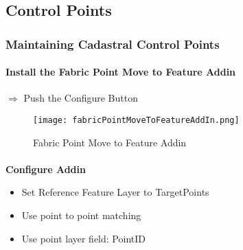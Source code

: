 \documentclass[class=article , crop=false, titlepage, twoside, multi={itemize, figure, verbatim}, float=false]{standalone}
\title{}  %
\begin{document}

\ifstandalone
\maketitle %
\tableofcontents %
\clearpage
\fi

\subsection{Control Points}
\medskip
\subsubsection[Editing Control Points]{Maintaining Cadastral Control Points}
\vspace{.1in}

\paragraph[Fabric Point Move to Feature Addin]{\textbf{ Install the Fabric Point Move to Feature Addin}}
\vspace{.1in}

{\Large $\Rightarrow$ Push the Configure Button}

\begin{figure}[h!]
\centering
    \texttt{[image: fabricPointMoveToFeatureAddIn.png]}

\caption{Fabric Point Move to Feature Addin}
\end{figure}
%
\clearpage
\paragraph[Configure Addin]{}\textbf{\Large Configure Addin}
\vspace{.1in}

\begin{itemize}

\item Set Reference Feature Layer to TargetPoints
\item Use point to point matching
\item Use point layer field: PointID
\end{itemize}
\end{document}
